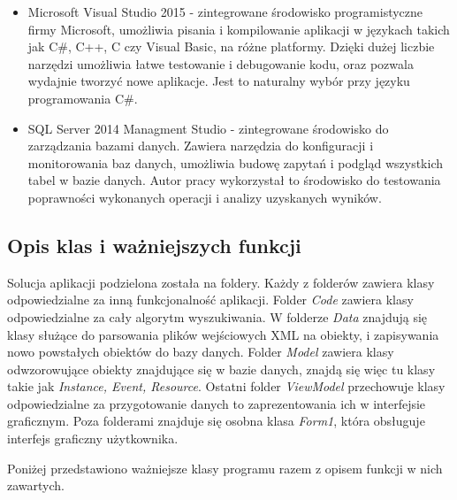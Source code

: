 \begin{itemize}
	\item Microsoft Visual Studio 2015 - zintegrowane środowisko programistyczne firmy Microsoft, umożliwia pisania i kompilowanie aplikacji w językach takich jak C\#, C++, C czy Visual Basic, na różne platformy. Dzięki dużej liczbie narzędzi umożliwia łatwe testowanie i debugowanie kodu, oraz pozwala wydajnie tworzyć nowe aplikacje. Jest to naturalny wybór przy języku programowania C\#.
	
	\item SQL Server 2014 Managment Studio - zintegrowane środowisko do zarządzania bazami danych. Zawiera narzędzia do konfiguracji i monitorowania baz danych, umożliwia budowę zapytań i podgląd wszystkich tabel w bazie danych. Autor pracy wykorzystał to środowisko do testowania poprawności wykonanych operacji i analizy uzyskanych wyników.
\end{itemize}

\subsection{Opis klas i ważniejszych funkcji}

Solucja aplikacji podzielona została na foldery. Każdy z folderów zawiera klasy odpowiedzialne za inną funkcjonalność aplikacji. Folder \textit{Code} zawiera klasy odpowiedzialne za cały algorytm wyszukiwania.  W folderze \textit{Data} znajdują się klasy służące do parsowania plików wejściowych XML na obiekty, i zapisywania nowo powstałych obiektów do bazy danych. Folder \textit{Model} zawiera klasy odwzorowujące obiekty znajdujące się w bazie danych, znajdą się więc tu klasy takie jak \textit{Instance, Event, Resource}. Ostatni folder \textit{ViewModel} przechowuje klasy odpowiedzialne za przygotowanie danych to zaprezentowania ich w interfejsie graficznym. Poza folderami znajduje się osobna klasa \textit{Form1}, która obsługuje interfejs graficzny użytkownika.

Poniżej przedstawiono ważniejsze klasy programu razem z opisem funkcji w nich zawartych.

